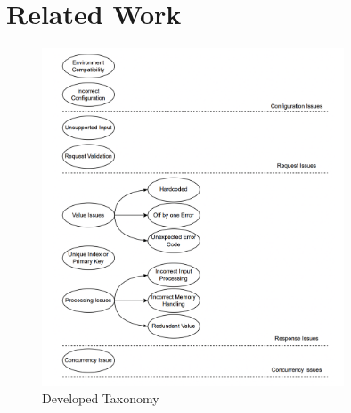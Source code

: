 \documentclass[conference]{IEEEtran}
\begin{document}
\section{Related Work}
\label{sec:relatedwork}

\begin{figure}[t] 
    \centering
    \includegraphics[width=0.8\textwidth]{TaxonomyDeveloped.png}
    \caption{Developed Taxonomy}
    \label{fig:TaxonomyDeveloped}
  \end{figure}





\end{document}
